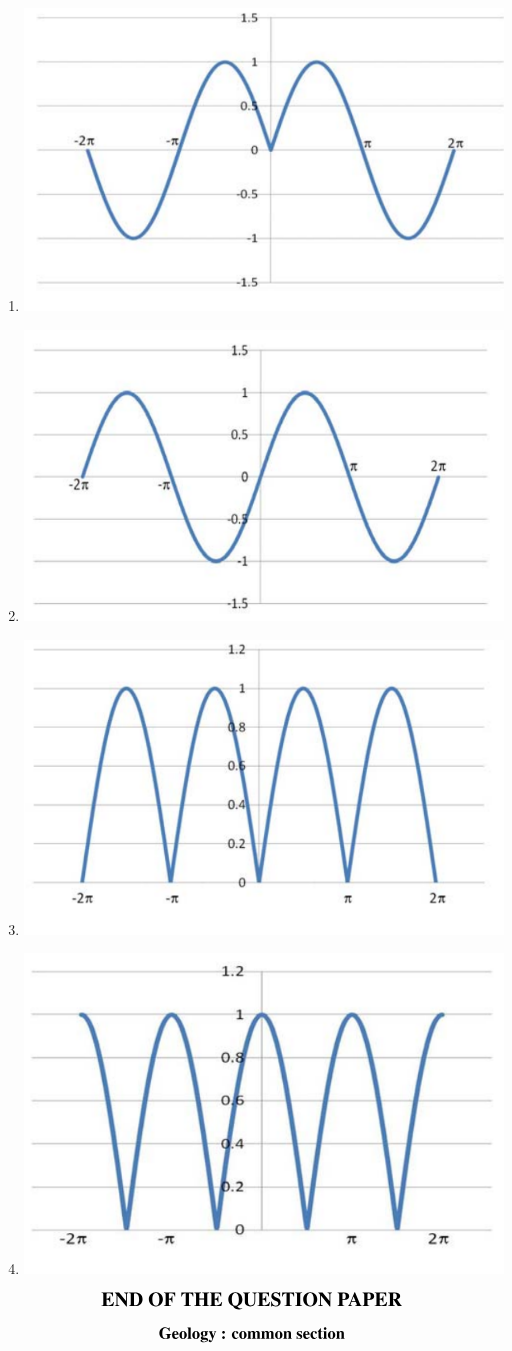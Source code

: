 \documentclass[journal,12pt,onecolumn]{IEEEtran}
\begin{document}
\begin{enumerate}
\begin{enumerate}
\item \includegraphics[width=0.5\linewidth]{figs/fig1.png} 
\item \includegraphics[width=0.5\linewidth]{figs/fig2.png} 
\item \includegraphics[width=0.5\linewidth]{figs/fig3.png} 
\item \includegraphics[width=0.5\linewidth]{figs/fig4.png} 
\end{enumerate}





\begin{align*}
    {\Large{\textbf{END OF THE QUESTION PAPER}}}
\end{align*}

\begin{align*}
    {\large{\textbf{Geology : common section}}}
\end{align*}




\end{enumerate}
\end{document}
